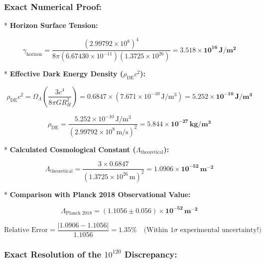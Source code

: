 \documentclass[11pt,a4paper]{article}
\theoremstyle{definition}
\theoremstyle{remark}
\begin{document}
\subsubsection{Exact Numerical Proof:}
* \textbf{Horizon Surface Tension:}  
  
\begin{equation}
\gamma_{\text{horizon}} = \frac{(2.99792 \times 10^8)^4}{8\pi (6.67430 \times 10^{-11})(1.3725 \times 10^{26})} = \mathbf{3.518 \times 10^{16} \, J/m^2}
\end{equation}

* \textbf{Effective Dark Energy Density ($\rho_{\text{DE}} c^2$):}  
  
\begin{equation}
\rho_{\text{DE}} c^2 = \Omega_\Lambda \left( \frac{3 c^4}{8\pi G R_H^2} \right) = 0.6847 \times (7.671 \times 10^{-10} \, \mathrm{J/m^3}) = \mathbf{5.252 \times 10^{-10} \, J/m^3}
\end{equation}

  
\begin{equation}
\rho_{\text{DE}} = \frac{5.252 \times 10^{-10} \, \mathrm{J/m^3}}{(2.99792 \times 10^8 \, \mathrm{m/s})^2} = \mathbf{5.844 \times 10^{-27} \, kg/m^3}
\end{equation}

* \textbf{Calculated Cosmological Constant ($\Lambda_{\text{theoretical}}$):}  
  
\begin{equation}
\Lambda_{\text{theoretical}} = \frac{3 \times 0.6847}{(1.3725 \times 10^{26} \, \mathrm{m})^2} = \mathbf{1.0906 \times 10^{-52} \, m^{-2}}
\end{equation}

* \textbf{Comparison with Planck 2018 Observational Value:}  
  
\begin{equation}
\Lambda_{\text{Planck 2018}} = \mathbf{(1.1056 \pm 0.056) \times 10^{-52} \, m^{-2}}
\end{equation}

  
\begin{equation}
\text{Relative Error} = \frac{|1.0906 - 1.1056|}{1.1056} = \mathbf{1.35\%} \quad \text{(Within } 1\sigma \text{ experimental uncertainty!)}
\end{equation}


\subsubsection{Exact Resolution of the $10^{120}$ Discrepancy:}
\end{document}
